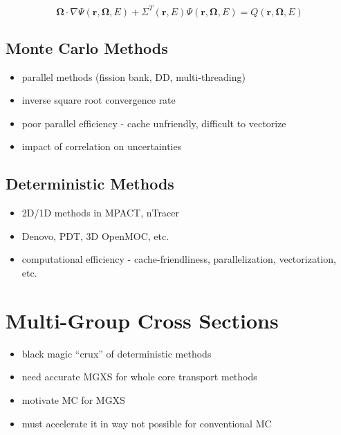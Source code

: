 \begin{equation}
\label{eqn:chap1-transport-eqn-src}
\mathbf{\Omega} \cdot \nabla \Psi(\mathbf{r},\mathbf{\Omega},E) + \Sigma^T(\mathbf{r},E)\Psi(\mathbf{r},\mathbf{\Omega},E) = Q(\mathbf{r},\mathbf{\Omega},E)
\end{equation}


\subsection{Monte Carlo Methods}
\label{subsec:chap1-monte-carlo}

\begin{itemize}
  \item parallel methods (fission bank, DD, multi-threading)
  \item inverse square root convergence rate
  \item poor parallel efficiency - cache unfriendly, difficult to vectorize
  \item impact of correlation on uncertainties
\end{itemize}


\subsection{Deterministic Methods}
\label{subsec:chap1-deterministic}


\begin{itemize}
  \item 2D/1D methods in MPACT, nTracer
  \item Denovo, PDT, 3D OpenMOC, etc.
  \item computational efficiency - cache-friendliness, parallelization, vectorization, etc.
\end{itemize}


\section{Multi-Group Cross Sections}
\label{sec:chap1-mgxs}

\begin{itemize}[noitemsep]
  \item black magic ``crux'' of deterministic methods
  \item need accurate \ac{MGXS} for whole core transport methods
  \item motivate \ac{MC} for \ac{MGXS}
  \item must accelerate it in way not possible for conventional \ac{MC}
\end{itemize}


